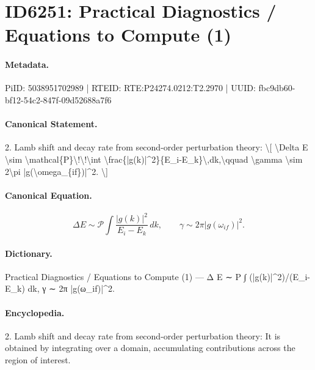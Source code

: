 \section*{ID6251: Practical Diagnostics / Equations to Compute (1)}
\paragraph{Metadata.}
PiID: 5038951702989 | RTEID: RTE:P24274.0212:T2.2970 | UUID: fbc9db60-bf12-54c2-847f-09d52688a7f6

\paragraph{Canonical Statement.}
2. Lamb shift and decay rate from second-order perturbation theory: \textbackslash{}[ \textbackslash{}Delta E \textbackslash{}sim \textbackslash{}mathcal\{P\}\textbackslash{}!\textbackslash{}!\textbackslash{}int \textbackslash{}frac\{|g(k)|\textasciicircum{}2\}\{E\_i-E\_k\}\textbackslash{},dk,\textbackslash{}qquad \textbackslash{}gamma \textbackslash{}sim 2\textbackslash{}pi |g(\textbackslash{}omega\_\{if\})|\textasciicircum{}2. \textbackslash{}]

\paragraph{Canonical Equation.}
\[
\Delta E \sim \mathcal{P}\!\!\int \frac{|g(k)|^2}{E_i-E_k}\,dk,\qquad \gamma \sim 2\pi |g(\omega_{if})|^2.
\]

\paragraph{Dictionary.}
Practical Diagnostics / Equations to Compute (1) — Δ E ∼ P ∫ (|g(k)|\textasciicircum{}2)/(E\_i-E\_k) dk, γ ∼ 2π |g(ω\_if)|\textasciicircum{}2.

\paragraph{Encyclopedia.}
2. Lamb shift and decay rate from second-order perturbation theory: It is obtained by integrating over a domain, accumulating contributions across the region of interest.
